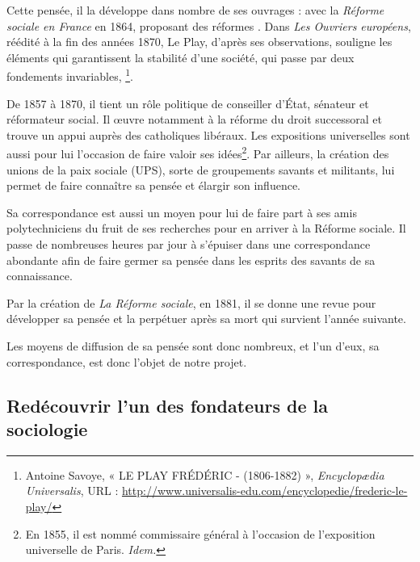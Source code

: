 Cette pensée, il la développe dans nombre de ses ouvrages : avec la \emph{Réforme sociale en France} en 1864,  proposant des réformes . Dans \emph{Les Ouvriers européens}, réédité à la fin des années 1870, Le Play, d'après ses observations, souligne les éléments qui garantissent la stabilité d'une société, qui passe par deux fondements invariables, \footnote {Antoine Savoye, « LE PLAY FRÉDÉRIC - (1806-1882) », \emph{Encyclopædia Universalis}, URL : \url{http://www.universalis-edu.com/encyclopedie/frederic-le-play/}}.

De 1857 à 1870, il tient un rôle politique de conseiller d'État, sénateur et réformateur social. Il \oe uvre notamment à la réforme du droit successoral et trouve un appui auprès des catholiques libéraux. Les expositions universelles sont aussi pour lui l'occasion de faire valoir ses idées\footnote{En 1855, il est nommé commissaire général à l'occasion de l'exposition universelle de Paris. \emph{Idem.}}. Par ailleurs, la création des unions de la paix sociale (UPS), sorte de groupements savants et militants, lui permet de faire connaître sa pensée et élargir son influence.

Sa correspondance est aussi un moyen pour lui de faire part à  ses amis polytechniciens du fruit de ses recherches pour en arriver à la Réforme sociale. Il passe de nombreuses heures par jour à s'épuiser dans une correspondance abondante afin de faire germer sa pensée dans les esprits des savants de sa connaissance. 

Par la création de \emph{La Réforme sociale}, en 1881, il se donne une revue pour développer sa pensée et la perpétuer après sa mort qui survient l'année suivante.

Les moyens de diffusion de sa pensée sont donc nombreux, et l'un d'eux, sa correspondance, est donc l'objet de notre projet.


\subsection{Redécouvrir l’un des fondateurs de la sociologie}
